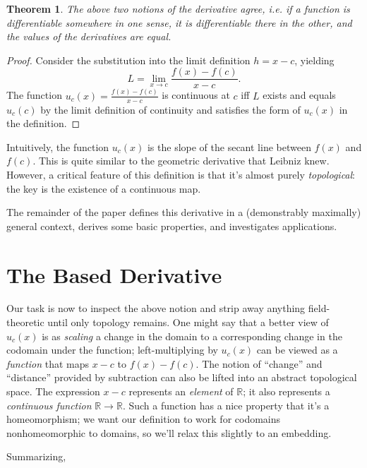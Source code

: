 \documentclass{article}
\newtheorem{thm}{Theorem}
\begin{document}
\begin{thm}
  The above two notions of the derivative agree, i.e. if a function is differentiable somewhere in one sense, it is differentiable there in the other,
  and the values of the derivatives are equal.
\end{thm}

\begin{proof}
  Consider the substitution into the limit definition $h = x - c$, yielding
  \[
    L = \lim_{x \to c}\frac{f(x) - f(c)}{x - c}.
  \]
  The function $u_{c}(x) = \frac{f(x) - f(c)}{x - c}$ is continuous at $c$ iff $L$ exists and equals $u_{c}(c)$ by the limit definition of continuity
  and satisfies the form of $u_{c}(x)$ in the definition.
\end{proof}

Intuitively, the function $u_{c}(x)$ is the slope of the secant line between $f(x)$ and $f(c)$.
This is quite similar to the geometric derivative that Leibniz knew. %
However, a critical feature of this definition is that it's almost purely \textit{topological}: the key is the existence of a continuous map.

The remainder of the paper defines this derivative in a (demonstrably maximally) general context, derives some basic properties,
and investigates applications.

\section{The Based Derivative}
Our task is now to inspect the above notion and strip away anything field-theoretic until only topology remains.
One might say that a better view of $u_{c}(x)$ is as \textit{scaling} a change in the domain to a corresponding change in the codomain under the function;
left-multiplying by $u_{c}(x)$ can be viewed as a \textit{function} that maps $x - c$ to $f(x) - f(c)$.
The notion of ``change'' and ``distance'' provided by subtraction can also be lifted into an abstract topological space.
The expression $x - c$ represents an \textit{element} of $\mathbb{R}$; it also represents a \textit{continuous function} $\mathbb{R} \to \mathbb{R}$.
Such a function has a nice property that it's a homeomorphism; we want our definition to work for codomains nonhomeomorphic to domains,
so we'll relax this slightly to an embedding.

Summarizing,
\end{document}
